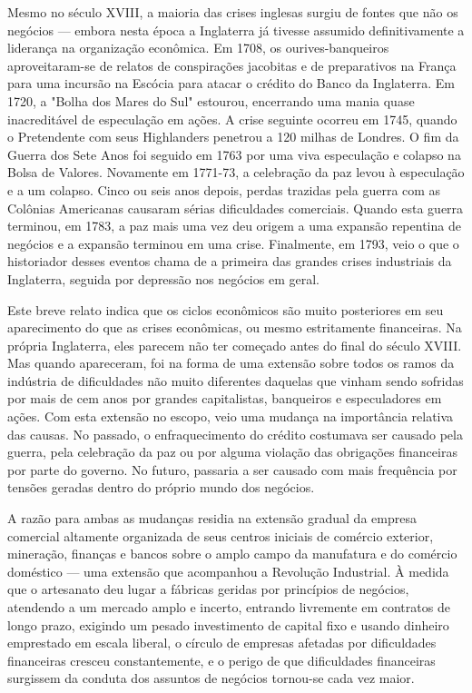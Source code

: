\documentclass[12pt]{article}
\begin{document}
Mesmo no século XVIII, a maioria das crises inglesas surgiu de fontes que não os negócios — embora nesta época a Inglaterra já tivesse assumido definitivamente a liderança na organização econômica. Em 1708, os ourives-banqueiros aproveitaram-se de relatos de conspirações jacobitas e de preparativos na França para uma incursão na Escócia para atacar o crédito do Banco da Inglaterra. Em 1720, a "Bolha dos Mares do Sul" estourou, encerrando uma mania quase inacreditável de especulação em ações. A crise seguinte ocorreu em 1745, quando o Pretendente com seus Highlanders penetrou a 120 milhas de Londres. O fim da Guerra dos Sete Anos foi seguido em 1763 por uma viva especulação e colapso na Bolsa de Valores. Novamente em 1771-73, a celebração da paz levou à especulação e a um colapso. Cinco ou seis anos depois, perdas trazidas pela guerra com as Colônias Americanas causaram sérias dificuldades comerciais. Quando esta guerra terminou, em 1783, a paz mais uma vez deu origem a uma expansão repentina de negócios e a expansão terminou em uma crise. Finalmente, em 1793, veio o que o historiador desses eventos chama de a primeira das grandes crises industriais da Inglaterra, seguida por depressão nos negócios em geral.

Este breve relato indica que os ciclos econômicos são muito posteriores em seu aparecimento do que as crises econômicas, ou mesmo estritamente financeiras. Na própria Inglaterra, eles parecem não ter começado antes do final do século XVIII. Mas quando apareceram, foi na forma de uma extensão sobre todos os ramos da indústria de dificuldades não muito diferentes daquelas que vinham sendo sofridas por mais de cem anos por grandes capitalistas, banqueiros e especuladores em ações. Com esta extensão no escopo, veio uma mudança na importância relativa das causas. No passado, o enfraquecimento do crédito costumava ser causado pela guerra, pela celebração da paz ou por alguma violação das obrigações financeiras por parte do governo. No futuro, passaria a ser causado com mais frequência por tensões geradas dentro do próprio mundo dos negócios.

A razão para ambas as mudanças residia na extensão gradual da empresa comercial altamente organizada de seus centros iniciais de comércio exterior, mineração, finanças e bancos sobre o amplo campo da manufatura e do comércio doméstico — uma extensão que acompanhou a Revolução Industrial. À medida que o artesanato deu lugar a fábricas geridas por princípios de negócios, atendendo a um mercado amplo e incerto, entrando livremente em contratos de longo prazo, exigindo um pesado investimento de capital fixo e usando dinheiro emprestado em escala liberal, o círculo de empresas afetadas por dificuldades financeiras cresceu constantemente, e o perigo de que dificuldades financeiras surgissem da conduta dos assuntos de negócios tornou-se cada vez maior.
\end{document}
